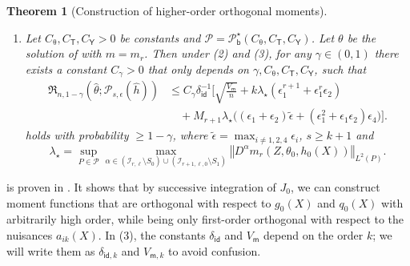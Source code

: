 \documentclass{article}
\def\eps{{\epsilon}}
\def\gI{{\mathcal{I}}}
\def\gP{{\mathcal{P}}}
\newcommand\normx[1]{\left\Vert#1\right\Vert}
\newtheorem{theorem}{Theorem}[section]
\begin{document}
\begin{theorem}[Construction of higher-order orthogonal moments]
\begin{enumerate}[(1).]
        and $S_1 = \left\{\alpha\in\mathbb{Z}_{\geq 0}^\ell: \max\left\{\alpha_2, \sum_{i=3}^{M_r+2}\alpha_i \right\} \geq 2\right\}$.
        Moreover, $D^{\alpha}m$ exists and is continuous for all $\|\alpha\|_1\leq k+1$.
        \item Let $C_{\uptheta}, C_{\mathsf{T}}, C_{\mathsf{Y}} > 0$ be constants and $\gP=\gP_{\mathsf{b}}^{\star}(C_{\uptheta}, C_{\mathsf{T}}, C_{\mathsf{Y}})$. Let $\theta$ be the solution of  with $m= m_r$. Then under  (2) and (3), for any $\gamma\in(0,1)$ there exists a constant $C_{\gamma}>0$ that only depends on $\gamma,C_{\uptheta}, C_{\mathsf{T}}, C_{\mathsf{Y}}$, such that
        \begin{equation}
            \label{eq:k-th-order-poly-upper-bound}
            \begin{aligned}
                \mathfrak{R}_{n,1-\gamma} (\hat{\theta};\gP_{s,\eps}(\hat{h})) &\leq C_{\gamma}\delta_{\mathsf{id}}^{-1}
                \bigg[\sqrt{\frac{V_{\mathsf{m}}}{n}}  + k\lambda_{\star}(\eps_1^{r+1}+\eps_1^{r}\eps_2) \\
                &\quad + M_{r+1}\lambda_{\star}\big((\eps_1+\eps_2)\tilde{\eps}+(\eps_1^2+\eps_1\eps_2)\eps_4\big) \bigg].
            \end{aligned}
        \end{equation}
        holds with probability $\geq 1-\gamma$, where $\tilde{\eps}=\max_{i\neq 1,2,4}\eps_i$, $s\geq k+1$ and $$\lambda_{\star} = \sup_{P\in\gP}\max_{\alpha\in(\gI_{r,\ell}\setminus S_0)\cup (\gI_{r+1,\ell,0}\setminus S_1)} \normx{D^{\alpha} m_r(Z,\theta_0,h_0(X))}_{L^2(P)}.$$
    \end{enumerate}
\end{theorem}

 is proven in . It shows that by successive integration of $J_0$, we can construct moment functions that are orthogonal with respect to $g_0(X)$ and $q_0(X)$ with arbitrarily high order, while being only first-order orthogonal with respect to the nuisances $a_{ik}(X)$. In (3), the constants $\delta_{\mathsf{id}}$ and $V_{\mathsf{m}}$ depend on the order $k$; we will write them as $\delta_{\mathsf{id},k}$ and $V_{\mathsf{m},k}$ to avoid confusion.
\end{document}
